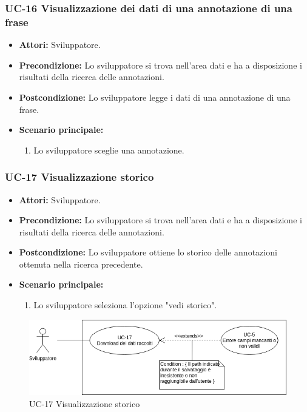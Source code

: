 	\subsubsection{UC-16 Visualizzazione dei dati di una annotazione di una frase}
		\begin{itemize}
			\item \textbf{Attori:} Sviluppatore.
			\item \textbf{Precondizione:} Lo sviluppatore si trova nell'area dati e ha a disposizione i risultati della ricerca delle annotazioni.
			\item \textbf{Postcondizione:} Lo sviluppatore legge i dati di una annotazione di una frase.
			\item \textbf{Scenario principale:}
				\begin{enumerate}
					\item Lo sviluppatore sceglie una annotazione.
				\end{enumerate}
		\end{itemize}
	
	\subsubsection{UC-17 Visualizzazione storico}		
		\begin{itemize}
			\item \textbf{Attori:} Sviluppatore.
			\item \textbf{Precondizione:} Lo sviluppatore si trova nell'area dati e ha a disposizione i risultati della ricerca delle annotazioni.
			\item \textbf{Postcondizione:} Lo sviluppatore ottiene lo storico delle annotazioni ottenuta nella ricerca precedente.
			\item \textbf{Scenario principale:}
			\begin{enumerate}
				\item Lo sviluppatore seleziona l'opzione "vedi storico".
			\end{enumerate}
		\end{itemize}
\begin{figure}[h]
			\centering
			\includegraphics[scale=0.7]{images/UC-17.png}
			\caption{UC-17 Visualizzazione storico}
		\end{figure}		
		
